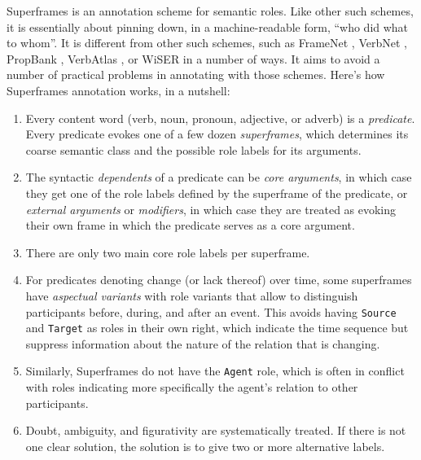 \documentclass[a4paper]{article}
\begin{document}
Superframes is an annotation scheme for semantic roles. Like other such
schemes, it is essentially about pinning down, in a machine-readable form,
``who did what to whom''. It is different from other such schemes, such as
FrameNet \citep{baker-etal-1998-berkeley}, VerbNet
\citep{kipper-schuler-2005-verbnet}, PropBank
\citep{palmer-etal-2005-proposition}, VerbAtlas
\citep{di-fabio-etal-2019-verbatlas}, or WiSER \citep{feng-etal-2022-widely} in
a number of ways. It aims to avoid a number of practical problems in annotating
with those schemes. Here's how Superframes annotation works, in a nutshell:

\begin{enumerate}
    \item Every content word (verb, noun, pronoun, adjective, or adverb) is a
        \emph{predicate}. Every predicate evokes one of a few dozen
        \emph{superframes}, which determines its coarse semantic class and the
        possible role labels for its arguments.
    \item The syntactic \emph{dependents} of a predicate can be
        \emph{core arguments}, in which case they get one of the role labels
        defined by the superframe of the predicate, or \emph{external
        arguments} or \emph{modifiers}, in which case they are treated as
        evoking their own frame in which the predicate serves as a core argument.
    \item There are only two main core role labels per superframe.
    \item For predicates denoting change (or lack thereof) over time,
        some superframes have \emph{aspectual variants} with role variants that
        allow to distinguish participants before, during, and after an event.
        This avoids having \texttt{Source} and \texttt{Target} as roles in
        their own right, which indicate the time sequence but suppress
        information about the nature of the relation that is changing.
    \item Similarly, Superframes do not have the \texttt{Agent} role, which is
        often in conflict with roles indicating more specifically the agent's
        relation to other participants.
    \item Doubt, ambiguity, and figurativity are systematically treated. If there
        is not one clear solution, the solution is to give two or more
        alternative labels.
\end{enumerate}
\end{document}
